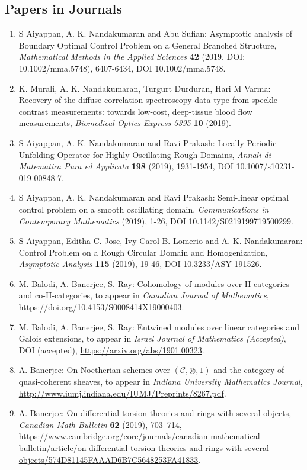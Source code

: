 
\subsection{Papers in Journals}

\begin{enumerate}
\item S Aiyappan, A. K. Nandakumaran and Abu Sufian: Asymptotic analysis of Boundary Optimal Control Problem on a General Branched Structure, \emph{Mathematical Methods in the Applied Sciences} {\bf 42} (2019. DOI: 10.1002/mma.5748), 6407-6434, DOI 10.1002/mma.5748.
\item K. Murali, A. K. Nandakumaran, Turgurt Durduran, Hari M Varma: Recovery of the diffuse correlation spectroscopy data-type from speckle contrast measurements: towards low-cost, deep-tissue blood flow measurements, \emph{Biomedical Optics Express 5395} {\bf 10} (2019).
\item S Aiyappan, A. K. Nandakumaran and Ravi Prakash: Locally Periodic Unfolding Operator for Highly Oscillating Rough Domains, \emph{Annali di Matematica Pura ed Applicata} {\bf 198} (2019), 1931-1954, DOI 10.1007/s10231-019-00848-7.
\item S Aiyappan, A. K. Nandakumaran and Ravi Prakash: Semi-linear optimal control problem on a smooth oscillating domain, \emph{Communications in Contemporary Mathematics} {\bf } (2019), 1-26, DOI 10.1142/S0219199719500299.
\item S Aiyappan, Editha C. Jose, Ivy Carol B. Lomerio and A. K. Nandakumaran: Control Problem on a Rough Circular Domain and Homogenization, \emph{Asymptotic Analysis} {\bf 115} (2019), 19-46, DOI 10.3233/ASY-191526.
\item M. Balodi, A. Banerjee, S. Ray: Cohomology of modules over H-categories and co-H-categories, to appear in \emph{Canadian Journal of Mathematics}, \url{https://doi.org/10.4153/S0008414X19000403}.
\item M. Balodi, A. Banerjee, S. Ray: Entwined modules over linear categories and Galois extensions, to appear in \emph{Israel Journal of Mathematics (Accepted)}, DOI (accepted), \url{https://arxiv.org/abs/1901.00323}.
\item A. Banerjee: On Noetherian schemes over $(\mathcal C,\otimes,1)$ and the category of quasi-coherent sheaves, to appear in \emph{Indiana University Mathematics Journal}, \url{http://www.iumj.indiana.edu/IUMJ/Preprints/8267.pdf}.
\item A. Banerjee: On differential torsion theories and rings with several objects, \emph{Canadian Math Bulletin} {\bf 62} (2019), 703--714, \url{https://www.cambridge.org/core/journals/canadian-mathematical-bulletin/article/on-differential-torsion-theories-and-rings-with-several-objects/574D81145FAAAD6B7C5648253FA41833}.

\end{enumerate}
